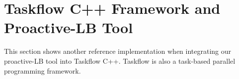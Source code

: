 
\section{Taskflow C++ Framework and Proactive-LB Tool}
\label{sec:PoC-Taskflow_plus_ProactLBTool}

This section shows another reference implementation when integrating our proactive-LB tool into Taskflow C++. Taskflow is also a task-based parallel programming framework.
